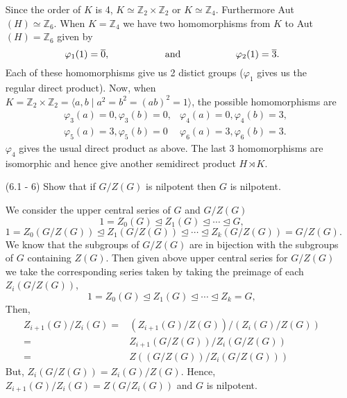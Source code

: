 \documentclass[12pt]{article}
\newcommand{\mz}{\mathbb{Z}}
\begin{document}
\begin{enumerate}
\begin{mybox}
    \vspace*{3mm}
    Since the order of $K$ is 4, $K\simeq \mz_2\times
    \mz_2$ or $K\simeq\mz_4$. Furthermore Aut$(H)
    \simeq \mz_6$. When $K=\mz_4$ we have two homomorphisms
    from $K$ to Aut$(H)=\mz_6$ given by
    $$\varphi_1(1)=\overline{0},\hspace*{20mm}
    \text{and}\hspace*{20mm}
    \varphi_2(1)=\overline{3}.$$
    Each of these homomorphisms give us 2 distict groups
    ($\varphi_1$ gives us the regular direct product).
    Now, when $K=\mz_2\times\mz_2=
    \langle a,b\mid a^2=b^2=(ab)^2=1\rangle$, the possible
    homomorphisms are
    \begin{align*}
    &\varphi_3(a)=0,\varphi_3(b)=0,
    &\varphi_4(a)=0,\varphi_4(b)=3,\\
    &\varphi_5(a)=3,\varphi_5(b)=0
    &\varphi_6(a)=3,\varphi_6(b)=3.
    \end{align*}
    $\varphi_4$ gives the usual direct product as above.
    The last 3 homomorphisms are isomorphic and hence
    give another semidirect product $H\rtimes K$.
\end{mybox}


\item[(6.1 - 6)] Show that if $G/Z(G)$ is nilpotent then
    $G$ is nilpotent.

\begin{mybox}
    
    We consider the upper central series of $G$ and
    $G/Z(G)$
    $$1=Z_0(G)\trianglelefteq Z_1(G)\trianglelefteq \cdots
    \trianglelefteq G,$$
    $$1=Z_0(G/Z(G))\trianglelefteq Z_1(G/Z(G))
    \trianglelefteq\cdots
    \trianglelefteq Z_k(G/Z(G))=G/Z(G).$$
    We know that the subgroups of $G/Z(G)$ are in
    bijection with the subgroups of $G$ containing $Z(G)$.
    Then given above upper central series for $G/Z(G)$
    we take the corresponding series 
    taken by taking the preimage of each $Z_i(G/Z(G))$,
    $$1=Z_0(G)\trianglelefteq Z_1(G)\trianglelefteq \cdots
    \trianglelefteq Z_k=G,$$
    Then,
    \begin{align*}
        Z_{i+1}(G)/Z_i(G)=&(Z_{i+1}(G)/Z(G))/
    (Z_i(G)/Z(G))\\
    =&Z_{i+1}(G/Z(G))/Z_i(G/Z(G))\\
    =&Z((G/Z(G))/Z_i(G/Z(G)))
    \end{align*}
    But, $Z_i(G/Z(G))=Z_i(G)/Z(G)$. Hence, 
    $Z_{i+1}(G)/Z_i(G)=Z(G/Z_i(G))$ and $G$ is nilpotent.
\end{mybox}


\end{enumerate}
\end{document}
